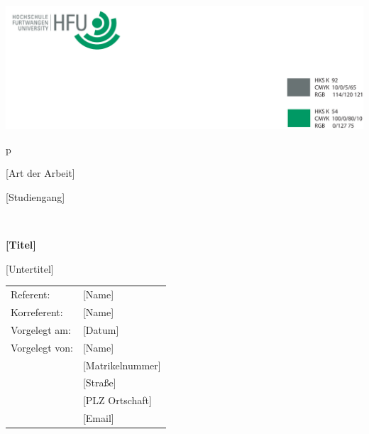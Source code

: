 \thispagestyle{empty}
\begin{titlepage}
    \hfill \includegraphics[scale=0.8]{1_Titlepage/LogoHFU.pdf}\\
    \begin{tabular}{p{\textwidth}}
        \begin{center}
            \LARGE{[Art der Arbeit]}
        \end{center}
        
        \begin{center}
            \LARGE{[Studiengang]}
        \end{center}
        \\
        \begin{center}
            \textbf{\Huge{[Titel]}}
        \end{center}

        \begin{center}
            \LARGE{[Untertitel]}
        \end{center}
        
        \begin{minipage}{\textwidth}
            \vskip 8cm
            {\normalsize}
            \begin{center}
                \begin{tabular}{ll}
                    Referent: & [Name]   \tabularnewline
                    Korreferent:& [Name]   \tabularnewline
                    Vorgelegt am:& [Datum]   \tabularnewline
                    Vorgelegt von:& [Name] \tabularnewline
                        & [Matrikelnummer]   \tabularnewline
                        & [Straße]   \tabularnewline
                        & [PLZ Ortschaft]   \tabularnewline
                        & [Email]    \tabularnewline
                \end{tabular}
            \end{center}
            {\normalsize}
        \end{minipage}
    \end{tabular}
\end{titlepage}
\restoregeometry        %
